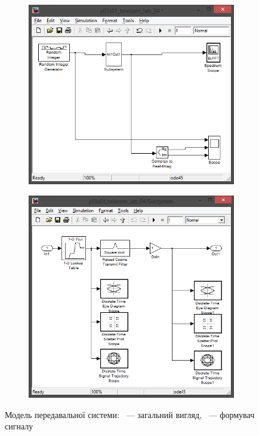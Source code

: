 \documentclass[
	a4paper,
	oneside,
	BCOR = 10mm,
	DIV = 12,
	12pt,
	headings = normal,
]{scrartcl}
\begin{document}
			\begin{figure}[!htbp]
				\begin{subfigure}[t]{\textwidth / 2}
					\centering
					\includegraphics[height = 9\baselineskip]{./assets/y03s01-telecom-lab-04-simulink-full-model.png}
					\caption{}
					\label{subfig:01-simulink-tx-model-full}
				\end{subfigure}%
				\begin{subfigure}[t]{\textwidth / 2}
					\centering
					\includegraphics[height = 9\baselineskip]{./assets/y03s01-telecom-lab-04-simulink-tx-model.png}
					\caption{}
					\label{subfig:01-simulink-tx-model-transmitter}
				\end{subfigure}
				\caption{Модель передавальної системи: ~— загальний вигляд, ~— формувач сигналу}
				\label{fig:01-simulink-tx-model}
			\end{figure}
\end{document}
